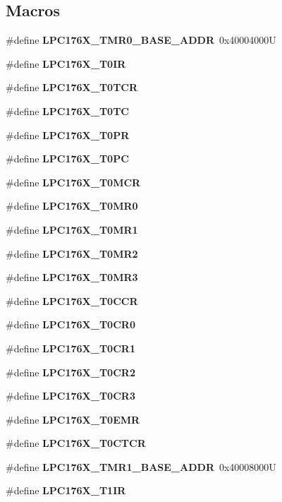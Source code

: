 \subsection*{Macros}
\begin{DoxyCompactItemize}
\item 
\mbox{\label{timer-defs_8h_a7680977a67320cf86f4621fa8c0e21d3}} 
\#define {\bfseries L\+P\+C176\+X\+\_\+\+T\+M\+R0\+\_\+\+B\+A\+S\+E\+\_\+\+A\+D\+DR}~0x40004000U
\item 
\#define {\bfseries L\+P\+C176\+X\+\_\+\+T0\+IR}
\item 
\#define {\bfseries L\+P\+C176\+X\+\_\+\+T0\+T\+CR}
\item 
\#define {\bfseries L\+P\+C176\+X\+\_\+\+T0\+TC}
\item 
\#define {\bfseries L\+P\+C176\+X\+\_\+\+T0\+PR}
\item 
\#define {\bfseries L\+P\+C176\+X\+\_\+\+T0\+PC}
\item 
\#define {\bfseries L\+P\+C176\+X\+\_\+\+T0\+M\+CR}
\item 
\#define {\bfseries L\+P\+C176\+X\+\_\+\+T0\+M\+R0}
\item 
\#define {\bfseries L\+P\+C176\+X\+\_\+\+T0\+M\+R1}
\item 
\#define {\bfseries L\+P\+C176\+X\+\_\+\+T0\+M\+R2}
\item 
\#define {\bfseries L\+P\+C176\+X\+\_\+\+T0\+M\+R3}
\item 
\#define {\bfseries L\+P\+C176\+X\+\_\+\+T0\+C\+CR}
\item 
\#define {\bfseries L\+P\+C176\+X\+\_\+\+T0\+C\+R0}
\item 
\#define {\bfseries L\+P\+C176\+X\+\_\+\+T0\+C\+R1}
\item 
\#define {\bfseries L\+P\+C176\+X\+\_\+\+T0\+C\+R2}
\item 
\#define {\bfseries L\+P\+C176\+X\+\_\+\+T0\+C\+R3}
\item 
\#define {\bfseries L\+P\+C176\+X\+\_\+\+T0\+E\+MR}
\item 
\#define {\bfseries L\+P\+C176\+X\+\_\+\+T0\+C\+T\+CR}
\item 
\mbox{\label{timer-defs_8h_a4ff805894c82df37e3c91a9a2d65c0e0}} 
\#define {\bfseries L\+P\+C176\+X\+\_\+\+T\+M\+R1\+\_\+\+B\+A\+S\+E\+\_\+\+A\+D\+DR}~0x40008000U
\item 
\#define {\bfseries L\+P\+C176\+X\+\_\+\+T1\+IR}
\item 

\end{DoxyCompactItemize}
